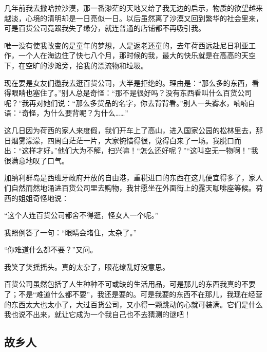 \par 几年前我去撒哈拉沙漠，那一番渺茫的天地又给了我无边的启示，物质的欲望越来越淡，心境的清明却是一日亮似一日。以后虽然离了沙漠又回到繁华的社会里来，可是百货公司竟跟我失了缘分，就连普通的店铺都不再吸引我。
\par 唯一没有使我改变的是童年的梦想，人是返老还童的，去年荷西远赴尼日利亚工作，一个人在海边住了快七八个月，那时候的我，最大的快乐就是在高高的天空下，在空旷的沙滩旁，拾我的漂流物和垃圾。
\par 现在要是女友们邀我去逛百货公司，大半是拒绝的。理由是：“那么多的东西，看得眼睛也塞住了。”别人总是奇怪：“那不是很好吗？没有东西看叫什么百货公司呢？”我再对她们说：“那么多货品的名字，你去背背看。”别人一头雾水，喃喃自语：“奇怪，为什么要背呢？为什么……”
\par 这几日因为荷西的家人来度假，我们开车上了高山，进入国家公园的松林里去，那日烟雾濛濛，四周白茫茫一片，大家惋惜得很，觉得白来了一场。我脱口而出：“这样才好。”他们大为不解，扫兴嘛！“怎么还好呢？”“这叫空无一物啊！”我很满意地叹了口气。
\par 加纳利群岛是西班牙政府开放的自由港，重税进口的东西在这儿便宜得多了，家人们自然而然地涌进百货公司里去购物，我甘愿坐在外面街上的露天咖啡座等候。荷西的姐姐奇怪地说：
\par “这个人连百货公司都舍不得逛，怪女人一个呢。”
\par 我照例答了一句：“眼睛会堵住，太杂了。”
\par “你难道什么都不要？”又问。
\par 我笑了笑摇摇头。真的太杂了，眼花缭乱好没意思。
\par 百货公司虽然包括了人生种种不可或缺的生活用品，可是那儿的东西我真的不要了；不是“难道什么都不要”，我还是要的。可是我要的东西不在那儿，我现在经营的东西太大也太小了，大过百货公司，又小得一颗跳动的心就可装满。它们是什么我也说不出来，就让它成为一个我自己也不去猜测的谜吧！


\subsection{故乡人}



